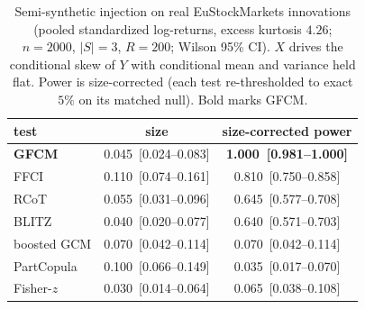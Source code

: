 \begin{table}[t]\centering\small
\setlength{\tabcolsep}{6pt}
\begin{tabular}{lcc}
\toprule
test & size & size-corrected power \\
\midrule
\textbf{GFCM} & 0.045~[0.024--0.083] & \textbf{1.000~[0.981--1.000]} \\
FFCI & 0.110~[0.074--0.161] & 0.810~[0.750--0.858] \\
RCoT & 0.055~[0.031--0.096] & 0.645~[0.577--0.708] \\
BLITZ & 0.040~[0.020--0.077] & 0.640~[0.571--0.703] \\
boosted GCM & 0.070~[0.042--0.114] & 0.070~[0.042--0.114] \\
PartCopula & 0.100~[0.066--0.149] & 0.035~[0.017--0.070] \\
Fisher-$z$ & 0.030~[0.014--0.064] & 0.065~[0.038--0.108] \\
\bottomrule
\end{tabular}
\caption{Semi-synthetic injection on real EuStockMarkets innovations (pooled standardized log-returns, excess kurtosis $4.26$; $n=2000$, $|S|=3$, $R=200$; Wilson 95\% CI). $X$ drives the conditional skew of $Y$ with conditional mean and variance held flat. Power is size-corrected (each test re-thresholded to exact $5\%$ on its matched null). Bold marks GFCM.}
\label{tab:inject}
\end{table}
